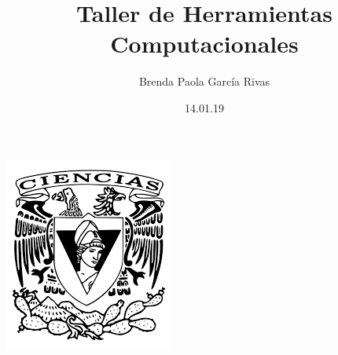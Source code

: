 \documentclass[letterpaper, 12pt, oneside]{article}
\title{\Huge\color{purple} Taller de Herramientas Computacionales}
\author{Brenda Paola García Rivas}
\date{14.01.19}
\begin{document}
	\maketitle
	\begin{center}
		\includegraphics[scale=0.95]{1.png}
	\end{center}
	
\end{document}
